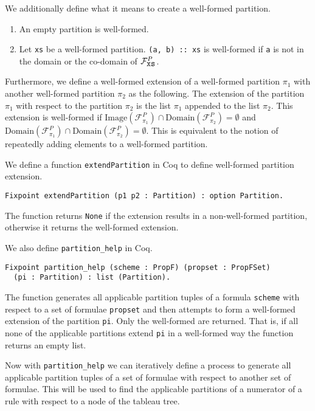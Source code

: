 \documentclass{llncs}
\begin{document}
We additionally define what it means to create a well-formed partition.

\begin{enumerate}
\item An empty partition is well-formed.
\item Let \verb+xs+ be a well-formed partition. \verb+(a, b) :: xs+ is
well-formed if \verb+a+ is not in the domain or the co-domain of
$\mathcal{F}^{P}_{\verb+xs+}$.
\end{enumerate}

Furthermore, we define a well-formed extension of a well-formed partition
$\pi_1$ with another well-formed partition $\pi_2$ as the following. The
extension of the partition $\pi_1$ with respect to the partition $\pi_2$ is
the list $\pi_1$ appended to the list $\pi_2$. This extension is well-formed
if $\textrm{Image}(\mathcal{F}^{P}_{\pi_1}) \cap
\textrm{Domain}(\mathcal{F}^{P}_{\pi_2}) = \emptyset$ and
$\textrm{Domain}(\mathcal{F}^{P}_{\pi_1}) \cap
\textrm{Domain}(\mathcal{F}^{P}_{\pi_2}) = \emptyset$. This is equivalent to
the notion of repeatedly adding elements to a well-formed partition.

We define a function \verb+extendPartition+ in Coq to define well-formed
partition extension.

\begin{verbatim}
Fixpoint extendPartition (p1 p2 : Partition) : option Partition.
\end{verbatim}

The function returns \verb+None+ if the extension results in a non-well-formed
partition, otherwise it returns the well-formed extension.

We also define \verb+partition_help+ in Coq.

\begin{verbatim}
Fixpoint partition_help (scheme : PropF) (propset : PropFSet)
  (pi : Partition) : list (Partition).
\end{verbatim}

The function generates all applicable partition tuples of a formula
\verb+scheme+ with respect to a set of formulae \verb+propset+ and then
attempts to form a well-formed extension of the partition \verb+pi+. Only the
well-formed are returned. That is, if all none of the applicable partitions
extend \verb+pi+ in a well-formed way the function returns an empty list.

Now with \verb+partition_help+ we can iteratively define a process to generate
all applicable partition tuples of a set of formulae with respect to another
set of formulae. This will be used to find the applicable partitions of a
numerator of a rule with respect to a node of the tableau tree.
\end{document}
